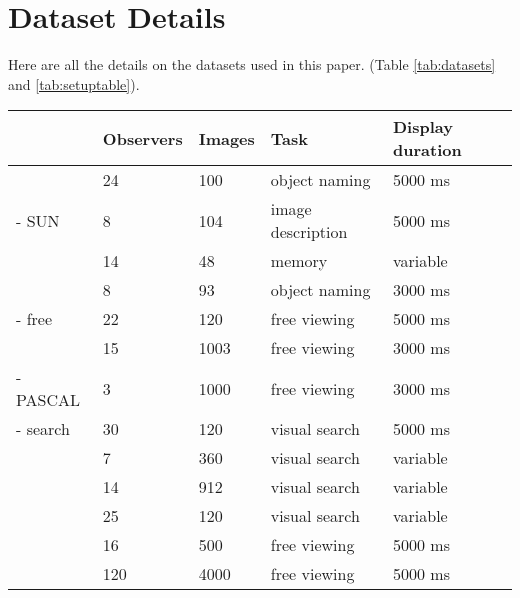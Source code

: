 \section{Dataset Details}

Here are all the details on the datasets used in this paper. (Table \ref{tab:datasets} and \ref{tab:setuptable}).


\begin{table*}
\centering
\small
\begin{tabular}{l|llll}
 						& Observers & Images &  Task & Display duration\\
\hline
\cite{clarke2013}     	& 24   	& 100   & object naming & 5000 ms\\
\cite{yun2013} - SUN    & 8     & 104   & image description & 5000 ms\\
\cite{tatler2005}     	& 14    & 48    & memory 			& variable\\
\cite{einhauser2008} 	& 8		& 93    & object naming 	& 3000 ms \\
\cite{tatler2007} - free & 22   & 120   & free viewing      & 5000 ms\\
\cite{judd2009}         & 15 	& 1003  & free viewing 		& 3000 ms\\
\cite{yun2013} - PASCAL & 3 	& 1000  & free viewing 		& 3000 ms\\
\cite{tatler2007} - search & 30 & 120	& visual search 	& 5000 ms\\
\hline
\cite{clarke2009} 		& 7		& 360	& visual search 	& variable\\
\cite{ehinger2009}     	& 14 	& 912 	& visual search 	& variable\\
\cite{asher2013}    	& 25    & 120   & visual search		& variable\\
\cite{jiang2014}  		& 16 	& 500 	& free viewing  	& 5000 ms \\
\cite{borji2015}  		& 120	& 4000  & free viewing		& 5000 ms\\
\end{tabular}

\caption{Summary of the 13 datasets used throughout this study. The top eight datasets were used to train the model, while the bottom five were only used for evaluation.}
\label{tab:datasets}
\end{table*}

